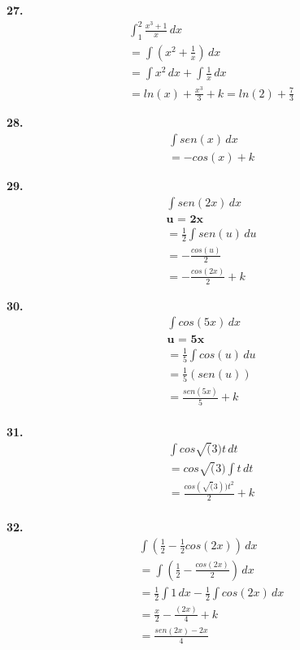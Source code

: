 \documentclass{article}
\begin{document}
\textbf{27.}
\begin{gather*}
    \int_{1}^{2} \frac{x^3 + 1}{x} \,dx
\\
    = \int (x^2 + \frac{1}{x})\,dx
\\
    = \int x^2 \,dx + \int \frac{1}{x}\,dx
\\ 
    = ln(x) + \frac{x^3}{3} + k = ln(2) + \frac{7}{3}
\end{gather*}

\textbf{28.}
\begin{gather*}
    \int sen(x) \,dx
\\
    = - cos(x) + k
\end{gather*}

\textbf{29.}
\begin{gather*}
    \int sen(2x) \,dx
\\
    \textbf{u = 2x}
\\
    = \frac{1}{2} \int sen(u)\,du
\\ 
    = -\frac{cos(u)}{2}
\\ 
    = -\frac{cos(2x)}{2} + k
\end{gather*}

\textbf{30.}
\begin{gather*}
    \int cos(5x) \,dx
\\
    \textbf{u = 5x} 
\\
    = \frac{1}{5}\int cos (u)\,du    
\\
    = \frac{1}{5} (sen(u))
\\ 
    = \frac{sen(5x)}{5} + k
\\
\end{gather*}

\textbf{31.}
\begin{gather*}
    \int cos \sqrt(3)t \,dt
\\
    = cos \sqrt(3) \int t\,dt
\\
    = \frac{cos(\sqrt(3)) t^2}{2} + k
\\
\end{gather*}

\textbf{32.}
\begin{gather*}
    \int (\frac{1}{2} - \frac{1}{2}cos(2x))\,dx
\\
    = \int (\frac{1}{2} - \frac{cos(2x)}{2})\,dx
\\
    = \frac{1}{2} \int 1\,dx - \frac{1}{2} \int cos(2x)\,dx
\\
    = \frac{x}{2} - \frac{(2x)}{4} + k
\\
    = \frac{sen(2x)-2x}{4}
\end{gather*}
\end{document}
